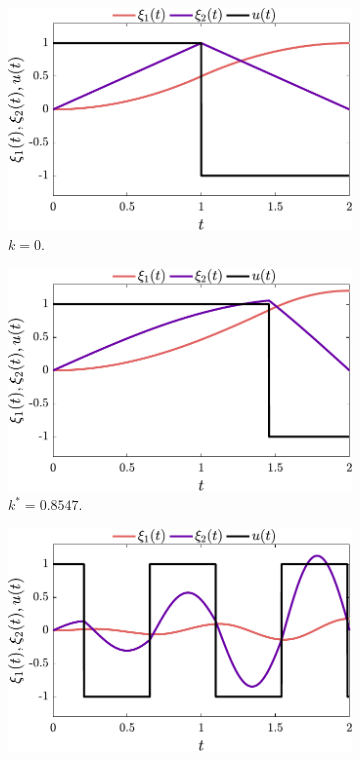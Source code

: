 \begin{figure}[t]
\centering
\begin{subfigure}[b]{0.333\textwidth}
       \centering
        \includegraphics[width=\textwidth]{../ch3/figures/sasa_1.pdf}
        \caption{$k=0$.\label{fig:ch3:sasa_1}}
\end{subfigure}%
\begin{subfigure}[b]{0.333\textwidth}
       \centering
        \includegraphics[width=\textwidth]{../ch3/figures/sasa_2.pdf}
        \caption{$k^*=0.8547$.\label{fig:ch3:sasa_2}}
\end{subfigure}%
\begin{subfigure}[b]{0.333\textwidth}
       \centering
        \includegraphics[width=\textwidth]{../ch3/figures/sasa_3.pdf}

\end{subfigure}
\end{figure}
